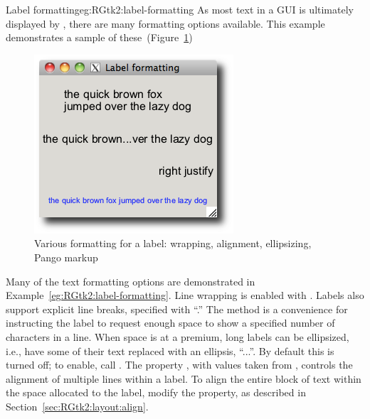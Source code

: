 \begin{example}{Label formatting}{eg:RGtk2:label-formatting}
  As most text in a \GTK\/ GUI is ultimately displayed by
  , there are many formatting options available.  This
  example demonstrates a sample of
  these~(Figure~\ref{fig:RGtk2:label-formatting})
  
  \begin{figure}
    \centering
    \includegraphics[width=.5\textwidth]{fig-RGtk2-labels}
    \caption{Various formatting for a label: wrapping, alignment,
      ellipsizing, Pango markup}
    \label{fig:RGtk2:label-formatting}
  \end{figure}
  
\begin{Schunk}
\end{Schunk}
\end{example}

Many of the text formatting options are demonstrated in
Example~\ref{eg:RGtk2:label-formatting}. Line wrapping is enabled with
. Labels also support explicit line
breaks, specified with ``\code{\backslashn}.'' The
 method is a convenience for instructing the
label to request enough space to show a specified number of
characters in a line.  When space is at a premium, long labels can be
ellipsized, i.e., have some of their text replaced with an
ellipsis, ``...''.  By default this is turned off; to enable, call
.  The property , with
values taken from , controls the alignment of
multiple lines within a label. To align the entire block of text
within the space allocated to the label, modify the 
property, as described in Section~\ref{sec:RGtk2:layout:align}.

